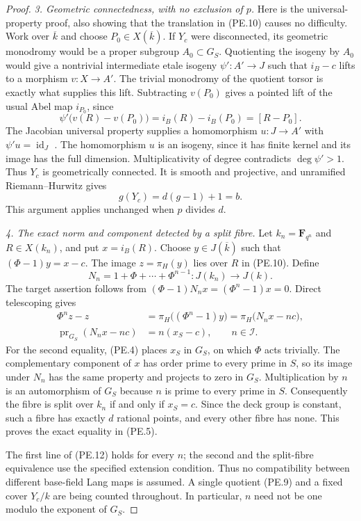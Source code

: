 \begin{proof}
\emph{3. Geometric connectedness, with no exclusion of $p$.}
Here is the universal-property proof, also showing that the
translation in (PE.10) causes no difficulty. Work over
$\overline k$ and choose $P_0\in X(\overline k)$.
If $Y_c$ were disconnected, its geometric monodromy would be a
proper subgroup $A_0\subset G_S$. Quotienting the isogeny by
$A_0$ would give a nontrivial intermediate etale isogeny
$\psi':A'\to J$ such that $i_B-c$ lifts to a morphism
$v:X\to A'$. The trivial monodromy of the quotient torsor is
exactly what supplies this lift. Subtracting $v(P_0)$ gives a
pointed lift of the usual Abel map $i_{P_0}$, since
\[
 \psi'\bigl(v(R)-v(P_0)\bigr)=i_B(R)-i_B(P_0)=[R-P_0].
\]
The Jacobian universal property supplies a homomorphism
$u:J\to A'$ with $\psi'u=\operatorname{id}_J$
\cite[Proposition~6.1, pp.~19--20]{MilneJV}.
The homomorphism $u$ is an isogeny, since it has finite kernel
and its image has the full dimension. Multiplicativity of degree
contradicts $\deg\psi'>1$. Thus $Y_c$ is geometrically connected.
It is smooth and projective, and unramified Riemann--Hurwitz gives
\[
                              g(Y_c)=d(g-1)+1=b.
 \tag{PE.11}
\]
This argument applies unchanged when $p$ divides $d$.

\emph{4. The exact norm and component detected by a split fibre.}
Let $k_n=\mathbf F_{q^n}$ and $R\in X(k_n)$, and put
$x=i_B(R)$. Choose $y\in J(\overline k)$ such that
$(\Phi-1)y=x-c$. The image $z=\pi_H(y)$ lies over $R$ in
(PE.10). Define
\[
 N_n=1+\Phi+\cdots+\Phi^{n-1}:J(k_n)\longrightarrow J(k).
\]
The target assertion follows from
$(\Phi-1)N_nx=(\Phi^n-1)x=0$. Direct telescoping gives
\[
 \begin{aligned}
 \Phi^n z-z
   &=\pi_H\bigl((\Phi^n-1)y\bigr)
     =\pi_H\bigl(N_nx-nc\bigr),\\
 \operatorname{pr}_{G_S}(N_nx-nc)
   &=n(x_S-c),\qquad n\in\mathcal I.
 \end{aligned}
 \tag{PE.12}
\]
For the second equality, (PE.4) places $x_S$ in $G_S$, on which
$\Phi$ acts trivially. The complementary component of $x$ has
order prime to every prime in $S$, so its image under $N_n$ has
the same property and projects to zero in $G_S$.
Multiplication by $n$ is an automorphism of $G_S$ because
$n$ is prime to every prime in $S$.
Consequently the fibre is split over $k_n$ if and only if
$x_S=c$. Since the deck group is constant, such a fibre has
exactly $d$ rational points, and every other fibre has none.
This proves the exact equality in (PE.5).

The first line of (PE.12) holds for every $n$; the second and the
split-fibre equivalence use the specified extension condition.
Thus no compatibility between different base-field Lang maps is
assumed. A single quotient (PE.9) and a fixed cover $Y_c/k$ are
being counted throughout. In particular, $n$ need not be one
modulo the exponent of $G_S$.


\end{proof}
